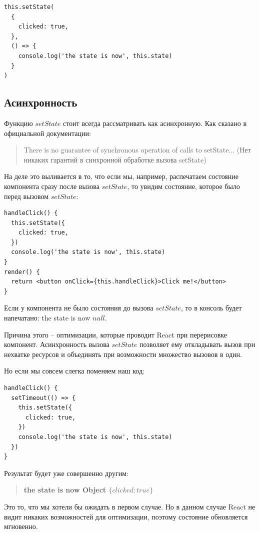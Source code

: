 \begin{lstlisting}
this.setState(
  {
    clicked: true,
  }, 
  () => {
    console.log('the state is now', this.state)
  }
)
\end{lstlisting}

\subsection{Асинхронность}

Функцию $setState$ стоит всегда рассматривать как асинхронную. 
Как сказано в официальной документации:

\begin{quotation}
There is no guarantee of synchronous operation of calls to setState... (Нет никаких гарантий в синхронной обработке вызова setState)
\end{quotation}

На деле это выливается в то, что если мы, например, распечатаем состояние компонента сразу после вызова $setState$, то увидим состояние, которое было перед вызовом $setState$:

\begin{lstlisting}
handleClick() {
  this.setState({
    clicked: true,
  })
  console.log('the state is now', this.state)
}
render() {
  return <button onClick={this.handleClick}>Click me!</button>
}
\end{lstlisting}

Если у компонента не было состояния до вызова $setState$, то в консоль будет напечатано: the state is now $null$.

Причина этого -- оптимизации, которые проводит React при перерисовке компонент. Асинхронность вызова $setState$ позволяет ему откладывать вызов при нехватке ресурсов и объединять при возможности множество вызовов в один.

Но если мы совсем слегка поменяем наш код:

\begin{lstlisting}
handleClick() {
  setTimeout(() => {
    this.setState({
      clicked: true,
    })
    console.log('the state is now', this.state)
  })
}
\end{lstlisting}

Результат будет уже совершенно другим:

\begin{quotation}
	\textbf{the state is now Object $\{clicked: true\}$}
\end{quotation}

Это то, что мы хотели бы ожидать в первом случае. 
Но в данном случае React не видит никаких возможностей для оптимизации, поэтому состояние обновляется мгновенно.

